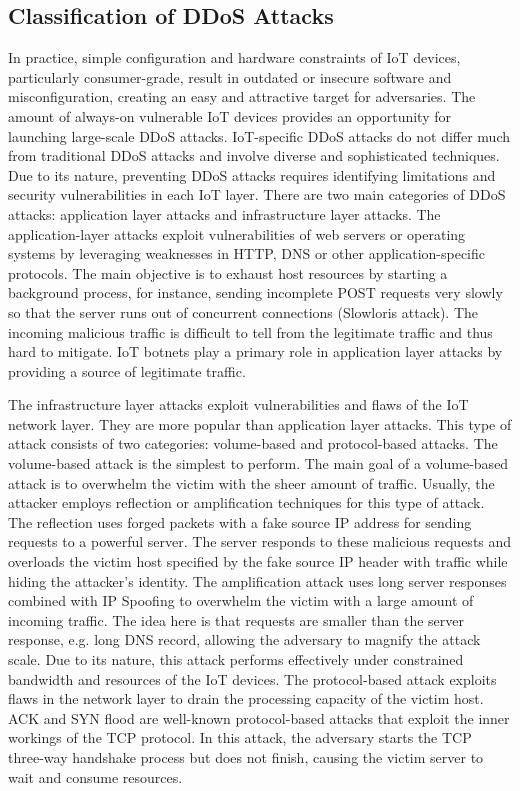 \documentclass[conference, 11pt]{IEEEtran}
\begin{document}
\subsection{Classification of DDoS Attacks}
In practice, simple configuration and hardware constraints of IoT devices, particularly consumer-grade, result in outdated or insecure software and misconfiguration, creating an easy and attractive target for adversaries.
The amount of always-on vulnerable IoT devices provides an opportunity for launching large-scale DDoS attacks.
IoT-specific DDoS attacks do not differ much from traditional DDoS attacks and involve diverse and sophisticated techniques.
Due to its nature, preventing DDoS attacks requires identifying limitations and security vulnerabilities in each IoT layer.
There are two main categories of DDoS attacks: application layer attacks and infrastructure layer attacks.
The application-layer attacks exploit vulnerabilities of web servers or operating systems by leveraging weaknesses in HTTP, DNS or other application-specific protocols.
The main objective is to exhaust host resources by starting a background process, for instance, sending incomplete POST requests very slowly so that the server runs out of concurrent connections (Slowloris attack).
The incoming malicious traffic is difficult to tell from the legitimate traffic and thus hard to mitigate.
IoT botnets play a primary role in application layer attacks by providing a source of legitimate traffic.

The infrastructure layer attacks exploit vulnerabilities and flaws of the IoT network layer.
They are more popular than application layer attacks. This type of attack consists of two categories: volume-based and protocol-based attacks.
The volume-based attack is the simplest to perform. The main goal of a volume-based attack is to overwhelm the victim with the sheer amount of traffic.
Usually, the attacker employs reflection or amplification techniques for this type of attack.
The reflection uses forged packets with a fake source IP address for sending requests to a powerful server.
The server responds to these malicious requests and overloads the victim host specified by the fake source IP header with traffic while hiding the attacker's identity.
The amplification attack uses long server responses combined with IP Spoofing to overwhelm the victim with a large amount of incoming traffic.
The idea here is that requests are smaller than the server response, e.g. long DNS record, allowing the adversary to magnify the attack scale.
Due to its nature, this attack performs effectively under constrained bandwidth and resources of the IoT devices.
The protocol-based attack exploits flaws in the network layer to drain the processing capacity of the victim host.
ACK and SYN flood are well-known protocol-based attacks that exploit the inner workings of the TCP protocol.
In this attack, the adversary starts the TCP three-way handshake process but does not finish, causing the victim server to wait and consume resources.
\end{document}
